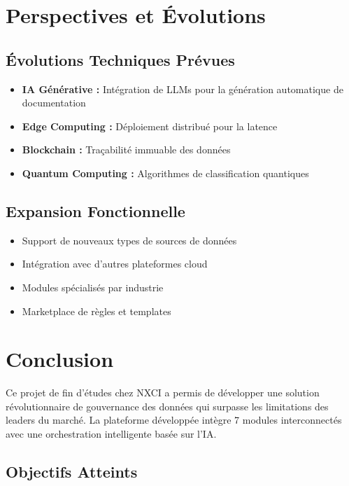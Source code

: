 \documentclass[a4paper,12pt]{article}
\begin{document}
\section*{Perspectives et Évolutions}

\subsection*{Évolutions Techniques Prévues}

\begin{itemize}
    \item \textbf{IA Générative :} Intégration de LLMs pour la génération automatique de documentation
    \item \textbf{Edge Computing :} Déploiement distribué pour la latence
    \item \textbf{Blockchain :} Traçabilité immuable des données
    \item \textbf{Quantum Computing :} Algorithmes de classification quantiques
\end{itemize}

\subsection*{Expansion Fonctionnelle}

\begin{itemize}
    \item Support de nouveaux types de sources de données
    \item Intégration avec d'autres plateformes cloud
    \item Modules spécialisés par industrie
    \item Marketplace de règles et templates
\end{itemize}

\section*{Conclusion}

Ce projet de fin d'études chez NXCI a permis de développer une solution révolutionnaire de gouvernance des données qui surpasse les limitations des leaders du marché. La plateforme développée intègre 7 modules interconnectés avec une orchestration intelligente basée sur l'IA.

\subsection*{Objectifs Atteints}
\end{document}
